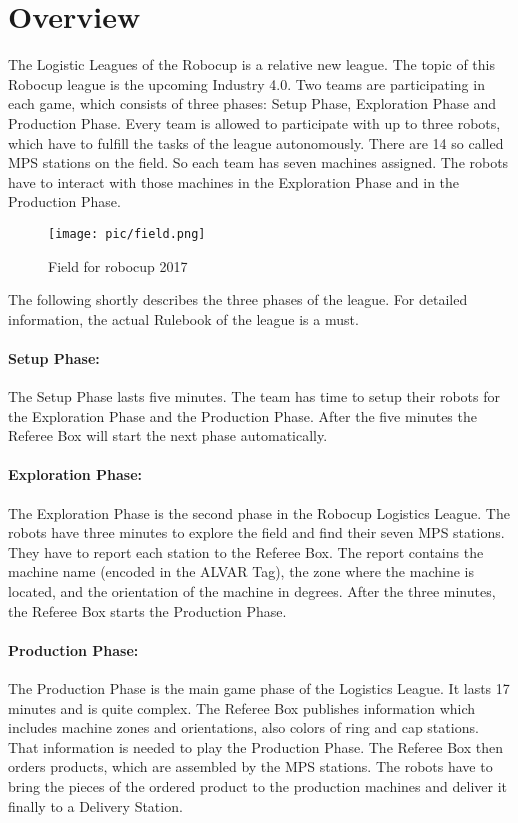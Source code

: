 \section{Overview}

The Logistic Leagues of the Robocup is a relative new league. The topic of this Robocup league is the upcoming Industry 4.0. Two teams are participating in each game, which consists of three phases: Setup Phase, Exploration Phase and Production Phase. Every team is allowed to participate with up to three robots, which have to fulfill the tasks of the league autonomously. There are 14 so called MPS stations on the field. So each team has seven machines assigned. The robots have to interact with those machines in the Exploration Phase and in the Production Phase.

\begin{figure}%
\centering
\texttt{[image: pic/field.png]}
\caption{Field for robocup 2017}
\label{fig:frog}
\end{figure}

The following shortly describes the three phases of the league. For detailed information, the actual Rulebook  \cite{RC17} of the league is a must.

\paragraph{Setup Phase:}
The Setup Phase lasts five minutes. The team has time to setup their robots for the Exploration Phase and the Production Phase. After the five minutes the Referee Box will start the next phase automatically.

\paragraph{Exploration Phase:}
The Exploration Phase is the second phase in the Robocup Logistics League. The robots have three minutes to explore the field and find their seven MPS stations. They have to report each station to the Referee Box. The report contains the machine name (encoded in the ALVAR Tag), the zone where the machine is located, and the orientation of the machine in degrees. After the three minutes, the Referee Box starts the Production Phase.

\paragraph{Production Phase:}
The Production Phase is the main game phase of the Logistics League. It lasts 17 minutes and is quite complex. The Referee Box publishes information which includes machine zones and orientations, also colors of ring and cap stations. That information is needed to play the Production Phase. The Referee Box then orders products, which are assembled by the MPS stations. The robots have to bring the pieces of the ordered product to the production machines and deliver it finally to a Delivery Station.


